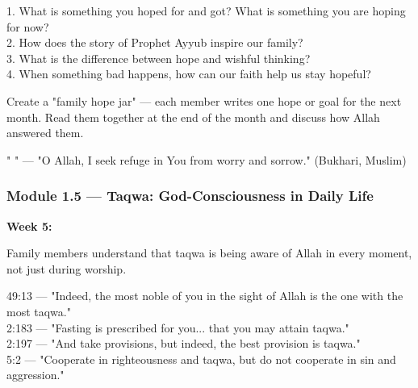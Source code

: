 \documentclass[11pt,a4paper]{article}
\begin{document}
\begin{discussionbox} 1. What is something you hoped for and got? What is something you are hoping for now? \\ 2. How does the story of Prophet Ayyub inspire our family? \\ 3. What is the difference between hope and wishful thinking? \\ 4. When something bad happens, how can our faith help us stay hopeful? \end{discussionbox}

\begin{activitybox} Create a "family hope jar" --- each member writes one hope or goal for the next month. Read them together at the end of the month and discuss how Allah answered them. \end{activitybox}

\begin{duabox} "      " --- "O Allah, I seek refuge in You from worry and sorrow." (Bukhari, Muslim) \end{duabox}

\vspace{6pt}\noindent{\color{border}\rule{\textwidth}{0.5pt}}\vspace{6pt}

\subsubsection*{Module 1.5 --- Taqwa: God-Consciousness in Daily Life}
\textbf{Week 5:} 

\begin{outcomebox} Family members understand that taqwa is being aware of Allah in every moment, not just during worship. \end{outcomebox}

\begin{quranbox} 49:13 --- "Indeed, the most noble of you in the sight of Allah is the one with the most taqwa." \\ 2:183 --- "Fasting is prescribed for you... that you may attain taqwa." \\ 2:197 --- "And take provisions, but indeed, the best provision is taqwa." \\ 5:2 --- "Cooperate in righteousness and taqwa, but do not cooperate in sin and aggression." \end{quranbox}
\end{document}
